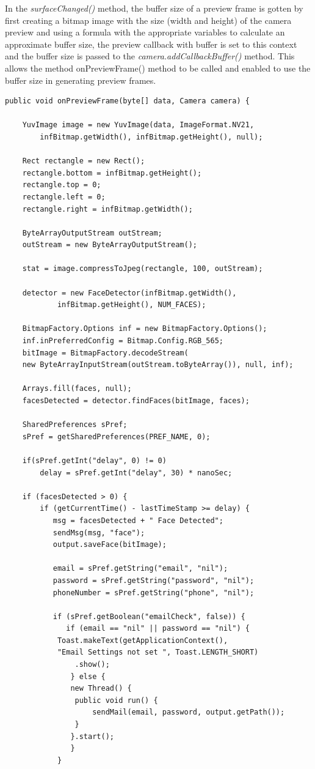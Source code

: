In the {\it surfaceChanged()} method, the buffer size of a preview frame is gotten by first creating a bitmap image with the size (width and height) of the camera preview and using a formula with the appropriate variables to calculate an approximate buffer size, the preview callback with buffer is set to this context and the buffer size is passed to the {\it camera.addCallbackBuffer()} method. This allows the method {onPreviewFrame()} method to be called and enabled to use the buffer size in generating preview frames.

\begin{lstlisting}[label=onPreview-frame,caption=Method for generating preview frames]
public void onPreviewFrame(byte[] data, Camera camera) {

	YuvImage image = new YuvImage(data, ImageFormat.NV21,
	    infBitmap.getWidth(), infBitmap.getHeight(), null);

	Rect rectangle = new Rect();
	rectangle.bottom = infBitmap.getHeight();
	rectangle.top = 0;
	rectangle.left = 0;
	rectangle.right = infBitmap.getWidth();
		
	ByteArrayOutputStream outStream;
	outStream = new ByteArrayOutputStream();
	
	stat = image.compressToJpeg(rectangle, 100, outStream);
	
	detector = new FaceDetector(infBitmap.getWidth(),
			infBitmap.getHeight(), NUM_FACES);

	BitmapFactory.Options inf = new BitmapFactory.Options();
	inf.inPreferredConfig = Bitmap.Config.RGB_565;
	bitImage = BitmapFactory.decodeStream(
	new ByteArrayInputStream(outStream.toByteArray()), null, inf);
		
	Arrays.fill(faces, null);
	facesDetected = detector.findFaces(bitImage, faces);
		
	SharedPreferences sPref;
	sPref = getSharedPreferences(PREF_NAME, 0);
		
	if(sPref.getInt("delay", 0) != 0)
		delay = sPref.getInt("delay", 30) * nanoSec;
		
	if (facesDetected > 0) {
		if (getCurrentTime() - lastTimeStamp >= delay) {
		   msg = facesDetected + " Face Detected";
		   sendMsg(msg, "face");
		   output.saveFace(bitImage);

		   email = sPref.getString("email", "nil");
		   password = sPref.getString("password", "nil");
		   phoneNumber = sPref.getString("phone", "nil");

		   if (sPref.getBoolean("emailCheck", false)) {
		      if (email == "nil" || password == "nil") {
		 	Toast.makeText(getApplicationContext(),
			"Email Settings not set ", Toast.LENGTH_SHORT)
				.show();
		       } else {
			   new Thread() {
				public void run() {
				    sendMail(email, password, output.getPath());
				}
			   }.start();
		       }
		    }


\end{lstlisting}
